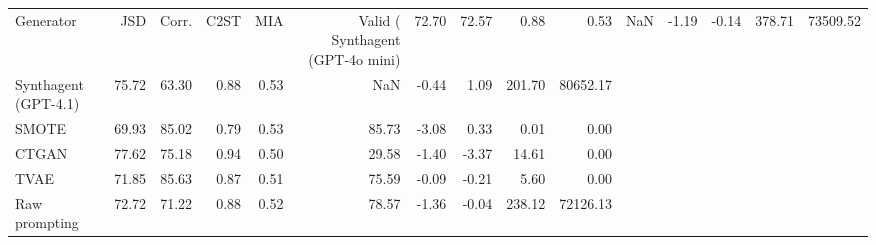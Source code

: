 \begin{tabular}{lrrrrrrrrr}
\toprule
Generator & JSD & Corr. & C2ST & MIA & Valid (%
\midrule
Synthagent (GPT-4o mini) & 72.70 & 72.57 & 0.88 & 0.53 & NaN & -1.19 & -0.14 & 378.71 & 73509.52 \\
Synthagent (GPT-4.1) & 75.72 & 63.30 & 0.88 & 0.53 & NaN & -0.44 & 1.09 & 201.70 & 80652.17 \\
SMOTE & 69.93 & 85.02 & 0.79 & 0.53 & 85.73 & -3.08 & 0.33 & 0.01 & 0.00 \\
CTGAN & 77.62 & 75.18 & 0.94 & 0.50 & 29.58 & -1.40 & -3.37 & 14.61 & 0.00 \\
TVAE & 71.85 & 85.63 & 0.87 & 0.51 & 75.59 & -0.09 & -0.21 & 5.60 & 0.00 \\
Raw prompting & 72.72 & 71.22 & 0.88 & 0.52 & 78.57 & -1.36 & -0.04 & 238.12 & 72126.13 \\
\bottomrule
\end{tabular}
